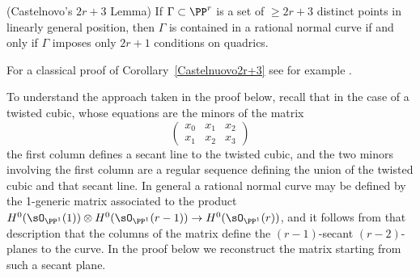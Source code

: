 \begin{corollary}(Castelnovo's $2r+3$ Lemma)\label{Castelnuovo2r+3}
If $\Gamma\subset \PP^r$ is a set of $\geq 2r+3$ distinct points in linearly general position, then
$\Gamma$ is contained in a rational normal curve if and only if $\Gamma$ imposes only $2r+1$
conditions on quadrics. 
\end{corollary}
 For a classical proof of Corollary~\ref{Castelnuovo2r+3} see for example \cite[p. 531]{Griffiths-Harris1978}.

 To understand the approach taken in the proof below, recall that in the case of a twisted
 cubic, whose equations are the minors of the matrix
 $$
\begin{pmatrix}
 x_0&x_1&x_2\\
 x_1&x_2&x_3
\end{pmatrix}
 $$
the first column defines a secant line to the twisted cubic, and the two minors involving the first column are a regular sequence defining the union of the twisted cubic and that secant line.
In general a rational normal curve may be defined by the 1-generic matrix  associated to the product $H^0(\sO_{\PP^1}(1)) \otimes H^0(\sO_{\PP^1}(r-1)) \to H^0(\sO_{\PP^1}(r))$,
and it follows from that description that the columns of the matrix define the $(r-1)$-secant $(r-2)$-planes to the curve. In the proof below we reconstruct the matrix starting from such a secant plane.

